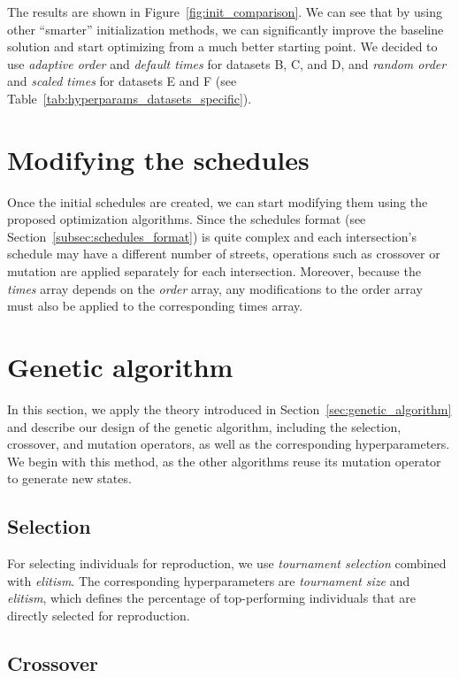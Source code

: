 The results are shown in Figure~\ref{fig:init_comparison}. We can see that by using other ``smarter'' initialization methods, we can significantly improve the baseline solution and start optimizing from a much better starting point.
We decided to use \textit{adaptive order} and \textit{default times} for datasets B, C, and D, and \textit{random order} and \textit{scaled times} for datasets E and F (see Table~\ref{tab:hyperparams_datasets_specific}).

\section{Modifying the schedules} \label{sec:modifying_the_schedules}

Once the initial schedules are created, we can start modifying them using the proposed optimization algorithms.
Since the schedules format (see Section~\ref{subsec:schedules_format}) is quite complex and each intersection's schedule may have a different number of streets, operations such as crossover or mutation are applied separately for each intersection. Moreover, because the \textit{times} array depends on the \textit{order} array, any modifications to the order array must also be applied to the corresponding times array.

\section{Genetic algorithm} \label{sec:genetic_algorithm_application}

In this section, we apply the theory introduced in Section~\ref{sec:genetic_algorithm} and describe our design of the genetic algorithm, including the selection, crossover, and mutation operators, as well as the corresponding hyperparameters. We begin with this method, as the other algorithms reuse its mutation operator to generate new states.

\subsection{Selection}

For selecting individuals for reproduction, we use \textit{tournament selection} combined with \textit{elitism}. The corresponding hyperparameters are \textit{tournament size} and \textit{elitism}, which defines the percentage of top-performing individuals that are directly selected for reproduction.
\subsection{Crossover}

